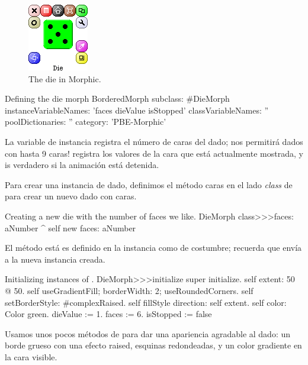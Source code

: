\documentclass[a4paper,10pt,twoside]{book}
\begin{document}
\begin{figure}[ht]
	\centerline{\includegraphics[scale=0.65]{die}}
	\caption{The die in Morphic.
		}
\end{figure}


\begin{classdef}{Defining the die morph}
BorderedMorph subclass: #DieMorph
	instanceVariableNames: 'faces dieValue isStopped'
	classVariableNames: ''
	poolDictionaries: ''
	category: 'PBE-Morphic'
\end{classdef}

La variable de instancia  registra el n\'umero de caras del dado; nos permitir\'a dados con hasta 9 caras!  registra los valores de la cara que est\'a actualmente mostrada, y  is verdadero si la animaci\'on est\'a detenida.

Para crear una instancia de dado, definimos el m\'etodo caras en el lado \emph{class}  de  para crear un nuevo dado con  caras.

\begin{method}{Creating a new die with the number of faces we like.}
DieMorph class>>>faces: aNumber
	^ self new faces: aNumber
\end{method}

El m\'etodo  est\'a es definido en la instancia como de costumbre; recuerda que  env\'ia  a la nueva instancia creada.
\begin{method}{Initializing instances of .}
DieMorph>>>initialize
	super initialize.
	self extent: 50 @ 50.
	self useGradientFill; borderWidth: 2; useRoundedCorners.
	self setBorderStyle: #complexRaised.
	self fillStyle direction: self extent.
	self color: Color green.
	dieValue := 1.
	faces := 6.
	isStopped := false
\end{method}

Usamos unos pocos m\'etodos de   para dar una apariencia agradable al dado: un borde grueso con una efecto raised, esquinas redondeadas, y un color gradiente en la cara visible.
\end{document}
